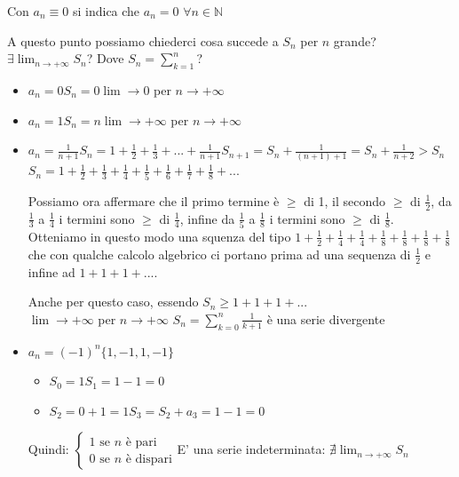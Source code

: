 \begin{notation*}
    Con $a_n\equiv0$ si indica che $a_n=0$ $\forall n\in\mathbb{N}$
\end{notation*}

A questo punto possiamo chiederci cosa succede a $S_n$ per $n$ grande? $\exists\lim_{n\to+\infty}S_n$? Dove $S_n=\sum^n_{k=1}$?

\begin{example}
    \begin{itemize}
        \item $a_n=0$\hspace{1cm}$S_n=0$\hspace{1cm}$\lim\to0$ per $n\to+\infty$
        \item $a_n=1$\hspace{1cm}$S_n=n$\hspace{1cm}$\lim\to+\infty$ per $n\to+\infty$
        \item $a_n=\frac{1}{n+1}$\hspace{1cm}$S_n=1+\frac{1}{2}+\frac{1}{3}+...+\frac{1}{n+1}$\hspace{1cm}$S_{n+1}=S_n+\frac{1}{(n+1)+1}=S_n+\frac{1}{n+2}>S_n$\\$S_n=1+\frac{1}{2}+\frac{1}{3}+\frac{1}{4}+\frac{1}{5}+\frac{1}{6}+\frac{1}{7}+\frac{1}{8}+...$
        
        Possiamo ora affermare che il primo termine è $\geq$ di 1, il secondo $\geq$ di $\frac{1}{2}$, da $\frac{1}{3}$ a $\frac{1}{4}$ i termini sono $\geq$ di $\frac{1}{4}$, infine da $\frac{1}{5}$ a $\frac{1}{8}$ i termini sono $\geq$ di $\frac{1}{8}$.
        Otteniamo in questo modo una squenza del tipo $1+\frac{1}{2}+\frac{1}{4}+\frac{1}{4}+\frac{1}{8}+\frac{1}{8}+\frac{1}{8}+\frac{1}{8}$ che con qualche calcolo algebrico ci portano prima ad una sequenza di $\frac{1}{2}$ e infine ad $1+1+1+...$.
        
        Anche per questo caso, essendo $S_n\geq1+1+1+...$\\
        $\lim\to+\infty$ per $n\to+\infty$\hspace{1cm} $S_n=\sum^n_{k=0}\frac{1}{k+1}$ è una serie divergente
        
        \item $a_n=(-1)^n$\hspace{1cm}$\{1,-1,1,-1\}$
        \begin{itemize}
            \item[] $S_0=1$\hspace{2.3cm}$S_1=1-1=0$
            \item[] $S_2=0+1=1$\hspace{1cm}$S_3=S_2+a_3=1-1=0$
        \end{itemize}
        
        Quindi:
        $\begin{cases}
            1 \text{ se } n \text{ è pari}\\
            0 \text{ se } n \text{ è dispari}
        \end{cases}$\hspace{1cm}E' una serie indeterminata: $\nexists\lim_{n\to+\infty}S_n$
    \end{itemize}
\end{example}

